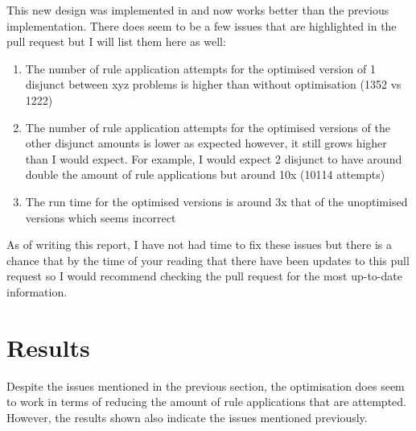 This new design was implemented in  and now works
better than the previous implementation. There does seem to be a few issues that
are highlighted in the pull request but I will list them here as well:

\begin{enumerate}
	\item The number of rule application attempts for the optimised version of 1
	      disjunct between xyz problems is higher than without optimisation (1352 vs
	      1222)
	\item The number of rule application attempts for the optimised versions of
	      the other disjunct amounts is lower as expected however, it still grows
	      higher than I would expect. For example, I would expect 2 disjunct to have
	      around double the amount of rule applications but around 10x (10114
	      attempts)
	\item The run time for the optimised versions is around 3x that of the
	      unoptimised versions which seems incorrect
\end{enumerate}

As of writing this report, I have not had time to fix these issues but there is a chance
that by the time of your reading that there have been updates to this pull request so
I would recommend checking the pull request for the most up-to-date information.

\section{Results}

Despite the issues mentioned in the previous section, the optimisation does seem to work in terms
of reducing the amount of rule applications that are attempted. However, the results shown also
indicate the issues mentioned previously.

